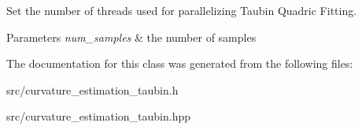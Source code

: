 \-Set the number of threads used for parallelizing \-Taubin \-Quadric \-Fitting. 


\begin{DoxyParams}{\-Parameters}
{\em num\-\_\-samples} & the number of samples \\
\hline
\end{DoxyParams}


\-The documentation for this class was generated from the following files\-:\begin{DoxyCompactItemize}
\item 
src/curvature\-\_\-estimation\-\_\-taubin.\-h\item 
src/curvature\-\_\-estimation\-\_\-taubin.\-hpp\end{DoxyCompactItemize}
